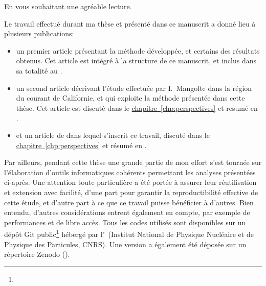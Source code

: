 En vous souhaitant une agréable lecture.

\clearpage
\thispagestyle{thesis-empty}

\label{sec:productions}

\begingroup
{}
Le travail effectué durant ma thèse et présenté dans ce manuscrit a donné lieu à plusieurs publications:
\begin{itemize}
  \setlength{\itemsep}{2\baselineskip}
  \renewcommand*\labelitemi{\adfrightarrowhead}
  \item un premier article présentant la méthode développée, et certains des résultats obtenus.
        Cet article est intégré à la structure de ce manuscrit, et inclus dans sa totalité au .

  \item un second article décrivant l'étude effectuée par I.\ Mangolte dans la région du courant de Californie, et qui exploite la méthode présentée dans cette thèse. Cet article est discuté dans le \hyperref[sec:CCE]{chapitre~\ref{chp:perspectives}} et resumé en .

  \item et un article de  dans lequel s’inscrit ce travail, discuté dans le \hyperref[sec:review]{chapitre~\ref{chp:perspectives}} et résumé en .
        \textnote[title={}]{\review{\articleReviewTitle}}

\end{itemize}
\endgroup


\bigskip

Par ailleurs, pendant cette thèse une grande partie de mon effort s'est tournée sur l'élaboration d'outils informatiques cohérents  permettant les analyses présentées ci-après.
Une attention toute particulière a été portée à assurer leur réutilisation et extension avec facilité, d'une part pour garantir la reproductibilité effective de cette étude, et d'autre part à ce que ce travail puisse bénéficier à d'autres.
Bien entendu, d'autres considérations entrent également en compte, par exemple de performances et de libre accès.
Tous les codes utilisés  sont disponibles sur un dépôt Git public\footnote{} hébergé par l'~(Institut National de Physique Nucléaire et de Physique des Particules, CNRS).
Une version a également été déposée sur un répertoire Zenodo (\hbox{}).

